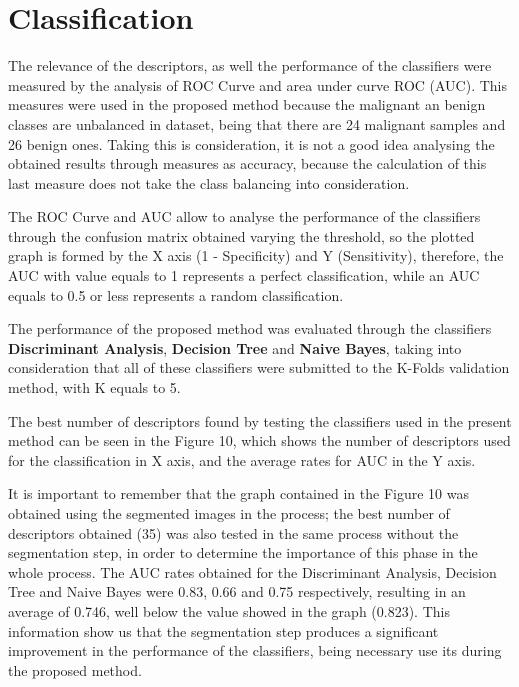 \documentclass[conference]{IEEEtran}
\begin{document}
\section{Classification}
The relevance of the descriptors, as well the performance of the classifiers were measured by the analysis of ROC Curve and area under curve ROC (AUC). This measures were used in the proposed method because the malignant an benign classes are unbalanced in dataset, being that there are 24 malignant samples and 26 benign ones. Taking this is consideration, it is not a good idea analysing the obtained results through measures as accuracy, because the calculation of this last measure does not take the class balancing into consideration.\par
The ROC Curve and AUC allow to analyse the performance of the classifiers through the confusion matrix obtained varying the threshold, so the plotted graph is formed by the X axis (1 - Specificity) and Y (Sensitivity), therefore, the AUC with value equals to 1 represents a perfect classification, while an AUC equals to 0.5 or less represents a random classification.\par
The performance of the proposed method was evaluated through the classifiers \textbf{Discriminant Analysis}, \textbf{Decision Tree} and \textbf{Naive Bayes}, taking into consideration that all of these classifiers were submitted to the K-Folds validation method, with K equals to 5.\par
The best number of descriptors found by testing the classifiers used in the present method can be seen in the Figure 10, which shows the number of descriptors used for the classification in X axis, and the average rates for AUC in the Y axis.\par
It is important to remember that the graph contained in the Figure 10 was obtained using the segmented images in the process; the best number of descriptors obtained (35) was also tested in the same process without the segmentation step, in order to determine the importance of this phase in the whole process. The AUC rates obtained for the Discriminant Analysis, Decision Tree and Naive Bayes were 0.83, 0.66 and 0.75 respectively, resulting in an average of 0.746, well below the value showed in the graph (0.823). This information show us that the segmentation step produces a significant improvement in the performance of the classifiers, being necessary use its during the proposed method.
\end{document}
